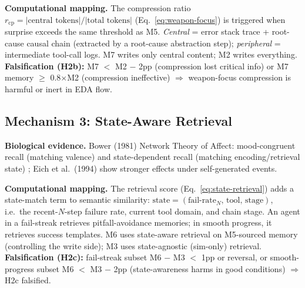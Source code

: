 \textbf{Computational mapping.} The compression ratio $r_{\text{cp}} = |\text{central tokens}|/|\text{total tokens}|$ (Eq.~\ref{eq:weapon-focus}) is triggered when surprise exceeds the same threshold as M5. \emph{Central} = error stack trace + root-cause causal chain (extracted by a root-cause abstraction step); \emph{peripheral} = intermediate tool-call logs. M7 writes only central content; M2 writes everything. \textbf{Falsification (H2b):} M7 $<$ M2 $-$ 2pp (compression lost critical info) or M7 memory $\geq$ 0.8$\times$M2 (compression ineffective) $\Rightarrow$ weapon-focus compression is harmful or inert in EDA flow.

\subsection{Mechanism 3: State-Aware Retrieval}

\textbf{Biological evidence.} Bower (1981) Network Theory of Affect: mood-congruent recall (matching valence) and state-dependent recall (matching encoding/retrieval state) \cite{bower1981}; Eich et al.\ (1994) show stronger effects under self-generated events.

\textbf{Computational mapping.} The retrieval score (Eq.~\ref{eq:state-retrieval}) adds a state-match term to semantic similarity: $\text{state}=(\text{fail-rate}_N,\,\text{tool},\,\text{stage})$, i.e.\ the recent-$N$-step failure rate, current tool domain, and chain stage. An agent in a fail-streak retrieves pitfall-avoidance memories; in smooth progress, it retrieves success templates. M6 uses state-aware retrieval on M5-sourced memory (controlling the write side); M3 uses state-agnostic (sim-only) retrieval. \textbf{Falsification (H2c):} fail-streak subset M6 $-$ M3 $<$ 1pp or reversal, or smooth-progress subset M6 $<$ M3 $-$ 2pp (state-awareness harms in good conditions) $\Rightarrow$ H2c falsified.

